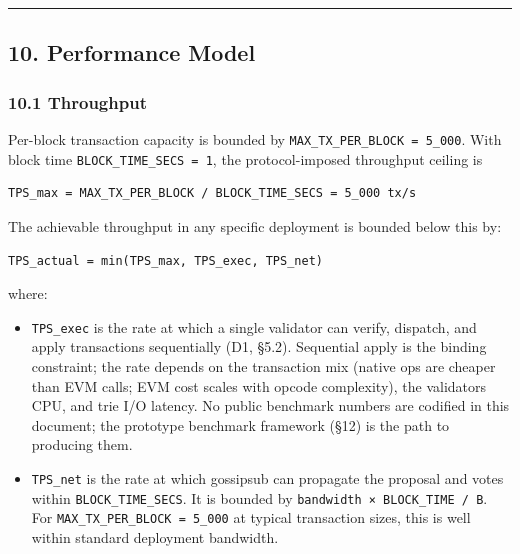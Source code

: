 \documentclass[11pt,a4paper]{article}
\providecommand{\tightlist}{\setlength{\itemsep}{0pt}\setlength{\parskip}{0pt}}
\begin{document}
\begin{center}\rule{0.5\linewidth}{0.5pt}\end{center}

\hypertarget{10-performance-model}{%
\subsection{10. Performance Model}\label{10-performance-model}}

\hypertarget{101-throughput}{%
\subsubsection{10.1 Throughput}\label{101-throughput}}

Per-block transaction capacity is bounded by
\texttt{MAX\_TX\_PER\_BLOCK\ =\ 5\_000}. With block time
\texttt{BLOCK\_TIME\_SECS\ =\ 1}, the protocol-imposed throughput
ceiling is

\begin{verbatim}
TPS_max = MAX_TX_PER_BLOCK / BLOCK_TIME_SECS = 5_000 tx/s
\end{verbatim}

The achievable throughput in any specific deployment is bounded below
this by:

\begin{verbatim}
TPS_actual = min(TPS_max, TPS_exec, TPS_net)
\end{verbatim}

where:

\begin{itemize}
\tightlist
\item
  \texttt{TPS\_exec} is the rate at which a single validator can verify,
  dispatch, and apply transactions sequentially (D1, §5.2). Sequential
  apply is the binding constraint; the rate depends on the transaction
  mix (native ops are cheaper than EVM calls; EVM cost scales with
  opcode complexity), the validator\textquotesingle s CPU, and trie I/O
  latency. No public benchmark numbers are codified in this document;
  the prototype benchmark framework (§12) is the path to producing them.
\item
  \texttt{TPS\_net} is the rate at which gossipsub can propagate the
  proposal and votes within \texttt{BLOCK\_TIME\_SECS}. It is bounded by
  \texttt{bandwidth\ ×\ BLOCK\_TIME\ /\ \textbar{}B\textbar{}}. For
  \texttt{MAX\_TX\_PER\_BLOCK\ =\ 5\_000} at typical transaction sizes,
  this is well within standard deployment bandwidth.
\end{itemize}
\end{document}
